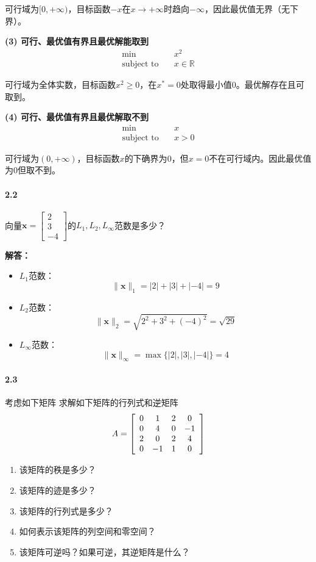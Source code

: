 \documentclass[12pt,a4paper]{article}
\begin{document}
	可行域为$[0, +\infty)$，目标函数$-x$在$x \to +\infty$时趋向$-\infty$，因此最优值无界（无下界）。
	
	\textbf{(3) 可行、最优值有界且最优解能取到}
	$$\begin{aligned}
	\min \quad & x^2 \\
	\text{subject to} \quad & x \in \mathbb{R}
	\end{aligned}$$
	
	可行域为全体实数，目标函数$x^2 \geq 0$，在$x^* = 0$处取得最小值$0$。最优解存在且可取到。
	
	\textbf{(4) 可行、最优值有界且最优解取不到}
	$$\begin{aligned}
	\min \quad & x \\
	\text{subject to} \quad & x > 0
	\end{aligned}$$
	
	可行域为$(0, +\infty)$，目标函数$x$的下确界为$0$，但$x=0$不在可行域内。因此最优值为$0$但取不到。
	
	
	\paragraph{2.2}
	向量$\mathbf{x}= \left[\begin{array}{c} 2  \\3 \\ -4 \end{array}\right]$的$L_1, L_2,  L_{\infty}$范数是多少？
	
	\textbf{解答：}
	
	\begin{itemize}
		\item $L_1$范数：
		$$\|\mathbf{x}\|_1 = |2| + |3| + |-4| = 9$$
		
		\item $L_2$范数：
		$$\|\mathbf{x}\|_2 = \sqrt{2^2 + 3^2 + (-4)^2} = \sqrt{29} $$
		
		\item $L_{\infty}$范数：
		$$\|\mathbf{x}\|_{\infty} = \max\{|2|, |3|, |-4|\} = 4$$
	\end{itemize}
	
	
	\paragraph{2.3}
	考虑如下矩阵
	求解如下矩阵的行列式和逆矩阵
	$$A= \left[\begin{array}{c c c c}
	0 & 1& 2 & 0 \\0 & 4 & 0 &-1 \\ 2 & 0 & 2 &4\\0 & -1 & 1 &0
	\end{array}\right]$$
	\begin{enumerate}
		\item 该矩阵的秩是多少？
		\item 该矩阵的迹是多少？
		\item 该矩阵的行列式是多少？
		\item 如何表示该矩阵的列空间和零空间？
		\item 该矩阵可逆吗？如果可逆，其逆矩阵是什么？
	\end{enumerate}
	
\end{document}
